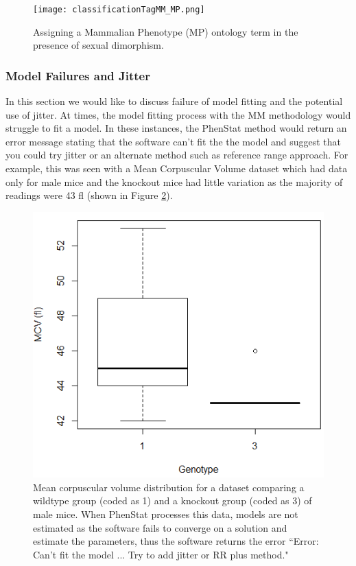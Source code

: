 \documentclass[12pt,a4paper]{article}
\begin{document}
\begin{figure}[!tpb]%
\centerline{\texttt{[image: classificationTagMM\_MP.png]}}
\caption{Assigning a Mammalian Phenotype (MP) ontology term in the presence of sexual dimorphism. }\label{fig:05_2}
\end{figure}


\subsubsection{Model Failures and Jitter}
In this section we would like to discuss failure of model fitting and the potential use of jitter.
At times,  the model fitting process with the MM methodology would struggle to fit a model.  In these instances,  the PhenStat method would return  an error message stating that the software can’t fit the the model  and suggest that you could try jitter or an alternate method such as reference range approach. For example,  this was seen with a Mean Corpuscular Volume dataset which had data only for male mice and the knockout mice had little variation as the majority of readings were 43 fl (shown in Figure \ref{fig:05_x}).

\begin{figure}[!tpb]%
\centerline{\includegraphics[scale=0.6]{Jitter_figureX.png}}
\caption{Mean corpuscular volume distribution for a dataset comparing a wildtype group (coded as 1) and a knockout group (coded as 3) of male mice.
When PhenStat processes this data,  models are not estimated as the software fails to converge on a solution and estimate the parameters,  thus the software returns the error “Error: Can’t fit the model ... Try to add jitter or RR plus method."}\label{fig:05_x}
\end{figure}
\end{document}
